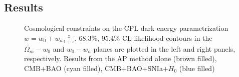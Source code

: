 \documentclass[iop]{emulateapj}
\begin{document}
\subsection{Results}

\begin{figure}
   \caption{\label{fig_con}
   Cosmological constraints on the CPL dark energy parametrization $w=w_0+w_a\frac{z}{1+z}$.
   68.3\%, 95.4\% CL likelihood contours in the $\Omega_m - w_0$  and $w_0 - w_a$ planes are plotted in the left and right panels, respectively.
   Results from the AP method alone (brown filled), CMB+BAO (cyan filled), CMB+BAO+SNIa+$H_0$ (blue filled)
}
\end{figure}
\end{document}
